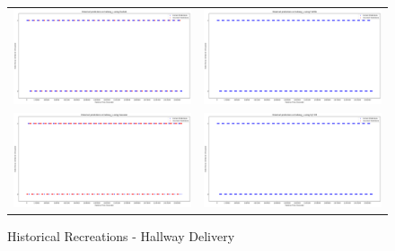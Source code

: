 \begin{figure}
  \begin{tabular}{cc}
    {\includegraphics[width = 3in]{images/results/Historical_hallway_L_Duckett.png}} &
    {\includegraphics[width = 3in]{images/results/Historical_hallway_L_FreMEn.png}} \\
    {\includegraphics[width = 3in]{images/results/Historical_hallway_L_Gaussian.png}} &
    {\includegraphics[width = 3in]{images/results/Historical_hallway_L_HyT-EM.png}} \\
  \end{tabular}
  \caption{Historical Recreations - Hallway Delivery}
\end{figure}\\ \\

